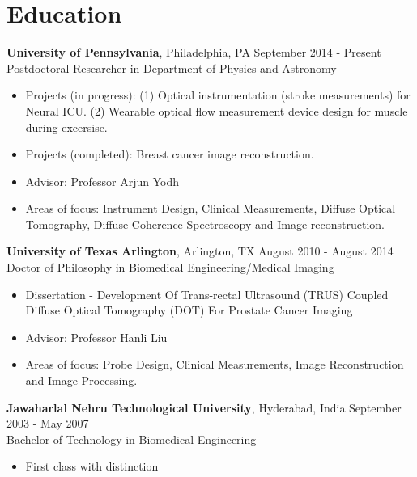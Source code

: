\documentclass{my_cv}
\begin{document}

\section{Education}
\begin{flushleft}  
\textbf{University of Pennsylvania}, Philadelphia, PA  \hfill September 2014 - Present \\ 
Postdoctoral Researcher in Department of Physics and Astronomy \\ 
\vspace{-3mm}
\begin{itemize}\itemsep -2pt
\item Projects (in progress): (1) Optical instrumentation (stroke measurements) for Neural ICU. (2) Wearable optical flow measurement device design for muscle during excersise.  
\item Projects (completed): Breast cancer image reconstruction. 
\item Advisor: Professor Arjun Yodh
\item Areas of focus: Instrument Design, Clinical Measurements, Diffuse Optical Tomography, Diffuse Coherence Spectroscopy and Image reconstruction.
\end{itemize}


\textbf{University of Texas Arlington}, Arlington, TX \hfill August 2010 - August 2014 \\ 
Doctor of Philosophy in Biomedical Engineering/Medical Imaging \\
\vspace{-3mm}
\begin{itemize}\itemsep -2pt
\item Dissertation -  Development Of Trans-rectal Ultrasound (TRUS) Coupled Diffuse Optical Tomography (DOT) For Prostate Cancer Imaging
\item Advisor: Professor Hanli Liu 
\item Areas of focus: Probe Design, Clinical Measurements, Image Reconstruction and Image Processing.
\end{itemize}
 
\textbf{Jawaharlal Nehru Technological University}, Hyderabad, India \hfill September 2003 - May 2007\\
Bachelor of Technology in Biomedical Engineering \\ 
\vspace{-3mm}
\begin{itemize}
\setlength\itemsep{0em} 
\item First class with distinction
\end{itemize}
\end{flushleft}  
 
\end{document}
